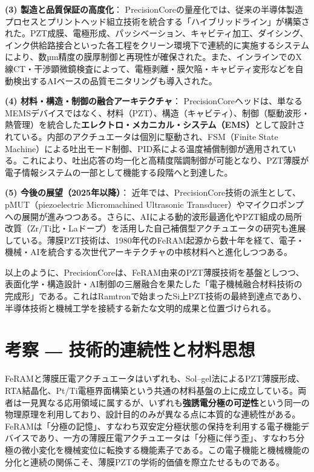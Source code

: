 \documentclass[conference]{IEEEtran}
\begin{document}
\medskip
\noindent
\textbf{(3) 製造と品質保証の高度化}：
PrecisionCoreの量産化では、従来の半導体製造プロセスとプリントヘッド組立技術を統合する「ハイブリッドライン」が構築された。PZT成膜、電極形成、パッシベーション、キャビティ加工、ダイシング、インク供給路接合といった各工程をクリーン環境下で連続的に実施するシステムにより、数µm精度の膜厚制御と再現性が確保された。また、インラインでのX線CT・干渉顕微鏡検査によって、電極剥離・膜欠陥・キャビティ変形などを自動検出するAIベースの品質モニタリングも導入された。

\medskip
\noindent
\textbf{(4) 材料・構造・制御の融合アーキテクチャ}：
PrecisionCoreヘッドは、単なるMEMSデバイスではなく、材料（PZT）、構造（キャビティ）、制御（駆動波形・熱管理）を統合した\textbf{エレクトロ・メカニカル・システム（EMS）}として設計されている。内部のアクチュエータは個別に駆動され、FSM（Finite State Machine）による吐出モード制御、PID系による温度補償制御が適用されている。これにより、吐出応答の均一化と高精度階調制御が可能となり、PZT薄膜が電子情報システムの一部として機能する段階へと到達した。

\medskip
\noindent
\textbf{(5) 今後の展望（2025年以降）}：
近年では、PrecisionCore技術の派生として、pMUT（piezoelectric Micromachined Ultrasonic Transducer）やマイクロポンプへの展開が進みつつある。さらに、AIによる動的波形最適化やPZT組成の局所改質（Zr/Ti比・Laドープ）を活用した自己補償型アクチュエータの研究も進展している。薄膜PZT技術は、1980年代のFeRAM起源から数十年を経て、電子・機械・AIを統合する次世代アーキテクチャの中核材料へと進化しつつある。

\medskip
以上のように、PrecisionCoreは、FeRAM由来のPZT薄膜技術を基盤としつつ、表面化学・構造設計・AI制御の三層融合を果たした「電子機械融合材料技術の完成形」である。これはRamtronで始まったSi上PZT技術の最終到達点であり、半導体技術と機械工学を接続する新たな文明的成果と位置づけられる。

\section{考察 ― 技術的連続性と材料思想}
FeRAMと薄膜圧電アクチュエータはいずれも、Sol--gel法によるPZT薄膜形成、RTA結晶化、Pt/Ti電極界面構築という共通の材料基盤の上に成立している。両者は一見異なる応用領域に属するが、いずれも\textbf{強誘電分極の可逆性}という同一の物理原理を利用しており、設計目的のみが異なる点に本質的な連続性がある。FeRAMは「分極の記憶」、すなわち双安定分極状態の保持を利用する電子機能デバイスであり、一方の薄膜圧電アクチュエータは「分極に伴う歪」、すなわち分極の微小変化を機械変位に転換する機能素子である。この電子機能と機械機能の分化と連続の関係こそ、薄膜PZTの学術的価値を際立たせるものである\cite{scott2000review,damjanovic2010ferro}。
\end{document}
